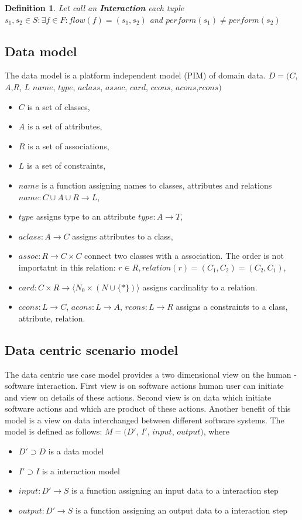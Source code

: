 \documentclass[10pt,a4paper]{article}
\newtheorem{mydef}{Definition}
\begin{document}
\begin{mydef}
Let call an \textbf{Interaction} each tuple $s_1, s_2 \in S: \exists f \in F: flow(f)=(s_1,s_2) $ and  $perform(s_1) \neq perform(s_2)$ 
\end{mydef}

\subsection{Data model}
The data model is a platform independent model (PIM) of domain data.
$D = ( C$,$ A$,$ R$, $L$ $name$, $type$, $aclass$, $assoc$, $card$, $ccons$, $acons$,$rcons)$
\begin{itemize}
	\item $C$ is a set of classes,
	\item $A$ is a set of attributes,
	\item $R$ is a set of associations,
	\item $L$ is a set of constraints,
	\item $name$ is a function assigning names to classes, attributes and relations $name: C \cup A \cup R \rightarrow L$,
	\item $type$ assigns type to an attribute $type: A \rightarrow T$,
	\item $aclass: A \rightarrow C$ assigns attributes to a class,
	\item $assoc: R \rightarrow C \times C$ connect two classes with a association. The order is not importatnt in this relation: $r \in R, relation(r)=(C_1, C_2)=(C_2, C_1)$,
	\item $card: C \times R \rightarrow \langle N_0 \times (N \cup \lbrace * \rbrace) \rangle$ assigns cardinality to a relation.
	\item $ccons: L \rightarrow C$, $acons: L \rightarrow A$, $rcons: L \rightarrow R$ assigns a constraints to a class, attribute, relation.
\end{itemize}



\subsection{Data centric scenario model}
The data centric use case model provides a two dimensional view on the human - software interaction. First view is on software actions human user can initiate and view on details of these actions. Second view is on data which initiate software actions and which are product of these actions. Another benefit of this model is a view on data interchanged between different software systems. The model is defined as follows:
$M = (D'$, $I'$, $input$, $output)$, where
\begin{itemize}
	\item $D' \supset D $ is a data model
	\item $I' \supset I$ is a interaction model
	\item $input: D' \rightarrow S$ is a function assigning an input data to a interaction step
	\item $output: D' \rightarrow S$ is a function assigning an output data to a interaction step
\end{itemize}
\end{document}
